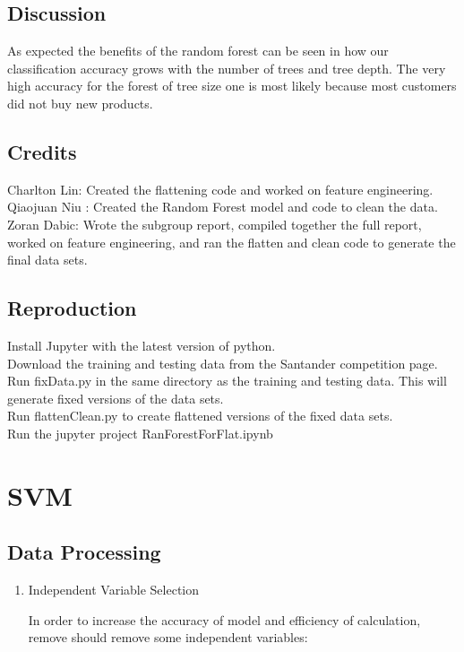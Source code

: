 \documentclass{article}
\begin{document}
\begin{spacing}{1}
\begin{large}
\subsection{Discussion}

As expected the benefits of the random forest can be seen in how our classification accuracy grows with the number of trees and tree depth. The very high accuracy for the forest of tree size one is most likely because most customers did not buy new products.


\subsection{Credits}

Charlton Lin: Created the flattening code and worked on feature engineering.
Qiaojuan Niu : Created the Random Forest model and code to clean the data.
Zoran Dabic: Wrote the subgroup report, compiled together the full report, worked on feature engineering, and ran the flatten and clean code to generate the final data sets.

\subsection{Reproduction}

Install Jupyter with the latest version of python. \\
Download the training and testing data from the Santander competition page. \\
Run fixData.py in the same directory as the training and testing data. This will generate fixed versions of the data sets. \\
Run flattenClean.py to create flattened versions of the fixed data sets. \\
Run the jupyter project RanForestForFlat.ipynb \\

\section{SVM}

\subsection{Data Processing}
\begin{enumerate}
	\item Independent Variable Selection
	
	In order to increase the accuracy of model and efficiency of calculation, remove should remove some independent variables:
	

\end{enumerate}
\end{large}
\end{spacing}
\end{document}
